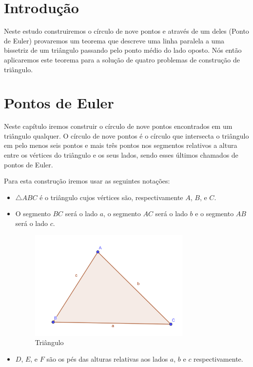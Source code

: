 \documentclass[12pt, openright, a4paper, brazil, openany, oneside]{abntex2}
\begin{document}


\frenchspacing 


\imprimircapa

\imprimirfolhaderosto*
\ABNTEXchapterfont

\tableofcontents*
\cleardoublepage
\textual

\chapter*[Introdução]{Introdução}


Neste estudo construiremos o círculo de nove pontos e através de um deles (Ponto de Euler) provaremos um teorema que descreve uma linha paralela a uma bissetriz de um triângulo passando pelo ponto médio do lado oposto. Nós então aplicaremos este teorema para a solução de quatro problemas de construção de triângulo.



\chapter{Pontos de Euler}

Neste capítulo iremos construir o círculo de nove pontos encontrados em um triângulo qualquer. O círculo de nove pontos é o círculo que intersecta o triângulo em pelo menos seis pontos e mais três pontos nos segmentos relativos a altura entre os vértices do triângulo e os seus lados, sendo esses últimos chamados de pontos de Euler.

Para esta construção iremos usar as seguintes notações:

\begin{itemize}
\item $\triangle ABC$ é o triângulo cujos vértices são, respectivamente $A$, $B$, e $C$.
\item O segmento $BC$ será o lado $a$, o segmento $AC$ será o lado $b$ e o segmento $AB$ será o lado $c$.

\begin{figure}[h]

    \center

    \includegraphics[width=8cm]{triangulo1.png}
    \caption{Triângulo \label{tria1}}
    
\end{figure}

\item $D$, $E$, e $F$ são os pés das alturas relativas aos lados $a$, $b$ e $c$ respectivamente.


\end{itemize} 
\end{document}
